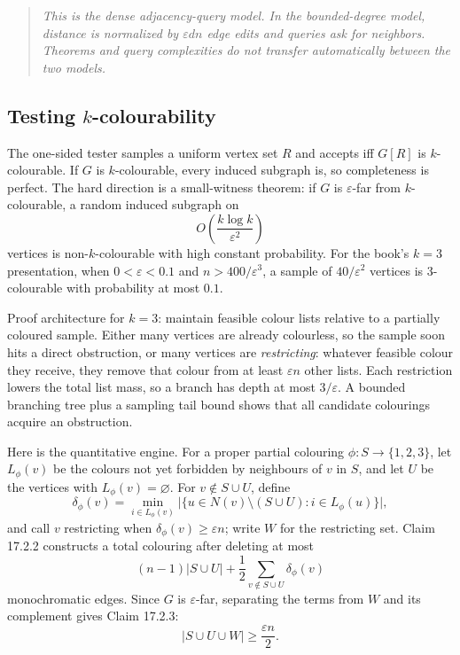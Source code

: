\documentclass[10pt]{article}
\newcommand{\1}{\mathbf 1}
\newenvironment{keybox}{\begin{quote}\small\itshape}{\end{quote}}
\begin{document}
\begin{keybox}
This is the dense adjacency-query model.  In the bounded-degree model, distance
is normalized by $\varepsilon dn$ edge edits and queries ask for neighbors.
Theorems and query complexities do not transfer automatically between the two
models.
\end{keybox}

\subsection{Testing $k$-colourability}

The one-sided tester samples a uniform vertex set $R$ and accepts iff $G[R]$ is
$k$-colourable.  If $G$ is $k$-colourable, every induced subgraph is, so
completeness is perfect.  The hard direction is a small-witness theorem:
if $G$ is $\varepsilon$-far from $k$-colourable, a random induced subgraph on
\[
 O\!\left(\frac{k\log k}{\varepsilon^2}\right)
\]
vertices is non-$k$-colourable with high constant probability.  For the
book's $k=3$ presentation, when $0<\varepsilon<0.1$ and
$n>400/\varepsilon^3$, a sample of $40/\varepsilon^2$ vertices is
3-colourable with probability at most $0.1$.

Proof architecture for $k=3$: maintain feasible colour lists relative to a
partially coloured sample.  Either many vertices are already colourless, so the
sample soon hits a direct obstruction, or many vertices are \emph{restricting}:
whatever feasible colour they receive, they remove that colour from at least
$\varepsilon n$ other lists.  Each restriction lowers the total list mass,
so a branch has depth at most $3/\varepsilon$.  A bounded branching tree plus a
sampling tail bound shows that all candidate colourings acquire an obstruction.

Here is the quantitative engine.  For a proper partial colouring
$\phi:S\to\{1,2,3\}$, let $L_\phi(v)$ be the colours not yet forbidden by
neighbours of $v$ in $S$, and let $U$ be the vertices with
$L_\phi(v)=\varnothing$.  For $v\notin S\cup U$, define
\[
 \delta_\phi(v)=
 \min_{i\in L_\phi(v)}
 \bigl|\{u\in N(v)\setminus(S\cup U):i\in L_\phi(u)\}\bigr|,
\]
and call $v$ restricting when $\delta_\phi(v)\geq\varepsilon n$; write $W$
for the restricting set.  Claim 17.2.2 constructs a total colouring after
deleting at most
\[
 (n-1)|S\cup U|+
 \frac12\sum_{v\notin S\cup U}\delta_\phi(v)
\]
monochromatic edges.  Since $G$ is $\varepsilon$-far, separating the terms
from $W$ and its complement gives Claim 17.2.3:
\[
 |S\cup U\cup W|\geq \frac{\varepsilon n}{2}.
\]
\end{document}
